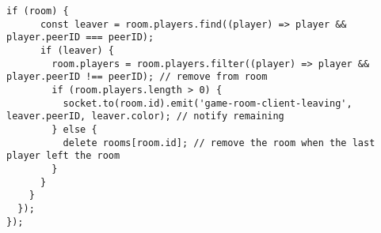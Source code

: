 \begin{singlespace}
\begin{lstlisting}[]
    if (room) {
      const leaver = room.players.find((player) => player && player.peerID === peerID);
      if (leaver) {
        room.players = room.players.filter((player) => player && player.peerID !== peerID); // remove from room
        if (room.players.length > 0) {
          socket.to(room.id).emit('game-room-client-leaving', leaver.peerID, leaver.color); // notify remaining
        } else {
          delete rooms[room.id]; // remove the room when the last player left the room
        }
      }
    }
  });
});
\end{lstlisting}
\end{singlespace}
